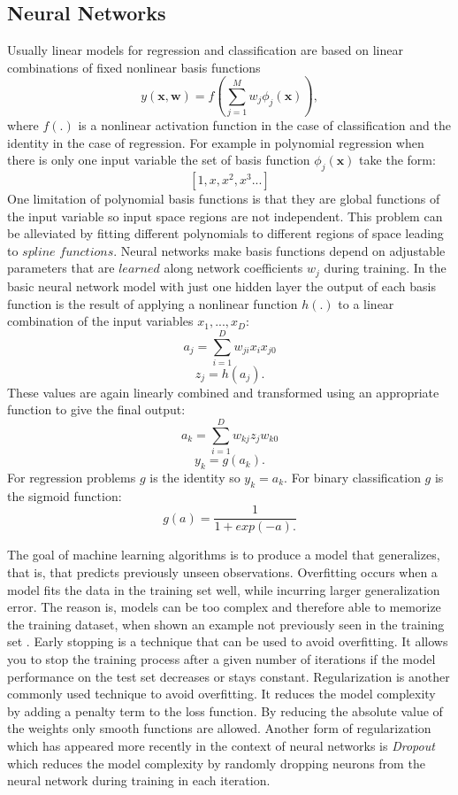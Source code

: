 \documentclass[a4paper,fleqn]{cas-dc}
\begin{document}
\subsection{Neural Networks}
Usually linear models for regression and classification are based on linear combinations of fixed nonlinear basis functions 
\[
y(\boldsymbol{x},\boldsymbol{w}) = f\left(\sum_{j=1}^{M}w_j\phi_j(\boldsymbol{x}) \right),
\]
where \(f(.) \) is a nonlinear activation function in the case of classification and the identity in the case of regression. For example in polynomial regression when there is only one input variable the set of basis function \(\phi_j(\boldsymbol{x}) \) take the form: \[
[1,x,x^2,x^3...]
\]
One limitation of polynomial basis functions is that they are global functions of the input variable so input space regions are not independent. This problem can be alleviated by fitting different polynomials to different regions of space leading to \(\textit{spline functions}. \)
Neural networks make basis functions depend on adjustable parameters that are \(\textit{learned}\) along network coefficients \(w_j\) during training. In the basic neural network model with just one hidden layer the output of each basis function is the result of applying a nonlinear function \(h(.)\)  to a linear combination of the input variables \(x_1,...,x_D \): \[
a_j = \sum_{i=1}^{D}w_{ji}x_ix_{j0}
\]
\[
z_j =h(a_j).
\]
These values are again linearly combined and  transformed using an appropriate function to give the final output: 
\[
a_k = \sum_{i=1}^{D}w_{kj}z_jw_{k0}
\]
\[
y_k =g(a_k).
\]
For regression problems \(g\) is the identity so \(y_k =a_k\). For binary classification \(g\) is the sigmoid function:\[
g(a)=\frac{1}{1+exp(-a).}
\] 

The goal of machine learning algorithms is to produce a model that generalizes, that is, that predicts previously unseen observations. Overfitting occurs when a model fits the data in the training set well, while incurring larger generalization error. The reason is,  models can be too complex and therefore able to memorize the training dataset, when shown an example not previously seen in the training set . Early stopping is a technique that can be used to avoid overfitting. It allows you to stop the training process after a given number of iterations if the model performance on the test set decreases or stays constant. Regularization is another commonly used technique to avoid overfitting. It reduces the model complexity by adding a penalty term to the loss function. By reducing the absolute value of the weights only smooth functions are allowed. Another form of regularization which has appeared more recently in the context of neural networks is \textit{Dropout} which reduces the model complexity by  randomly dropping neurons from the neural network during training in each iteration. 
\end{document}
